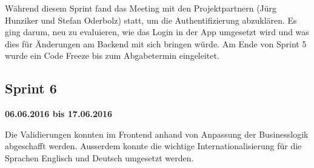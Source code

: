 Während diesem Sprint fand das Meeting mit den Projektpartnern (Jürg Hunziker und Stefan Oderbolz) statt, um die Authentifizierung abzuklären. 
Es ging darum, neu zu evaluieren, wie das Login in der App umgesetzt wird und was dies für Änderungen am Backend mit sich bringen würde. 
Am Ende von Sprint 5 wurde ein Code Freeze bis zum Abgabetermin eingeleitet.

\subsection{Sprint 6}
\textbf{06.06.2016 bis 17.06.2016}

Die Validierungen konnten im Frontend anhand von Anpassung der Businesslogik abgeschafft werden.
Ausserdem konnte die wichtige Internationalisierung für die Sprachen Englisch und Deutsch umgesetzt werden. 

